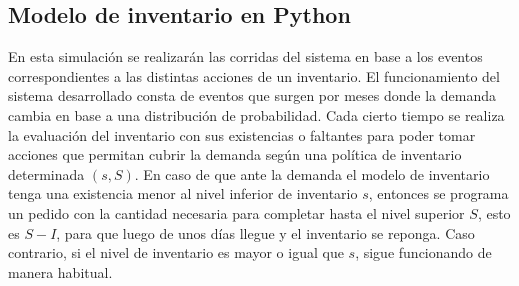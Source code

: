\subsection{Modelo de inventario en Python}

En esta simulación se realizarán las corridas del sistema en base a los eventos correspondientes a las distintas acciones de un inventario.
El funcionamiento del sistema desarrollado consta de eventos que surgen por meses donde la demanda cambia en base a una distribución de probabilidad.
Cada cierto tiempo se realiza la evaluación del inventario con sus existencias o faltantes para poder tomar acciones que permitan cubrir la demanda según una política de inventario determinada $(s, S)$.
En caso de que ante la demanda el modelo de inventario tenga una existencia menor al nivel inferior de inventario $s$, entonces se programa un pedido con la cantidad necesaria para completar hasta el nivel superior $S$, esto es $S - I$, para que luego de unos días llegue y el inventario se reponga.
Caso contrario, si el nivel de inventario es mayor o igual que $s$, sigue funcionando de manera habitual.

